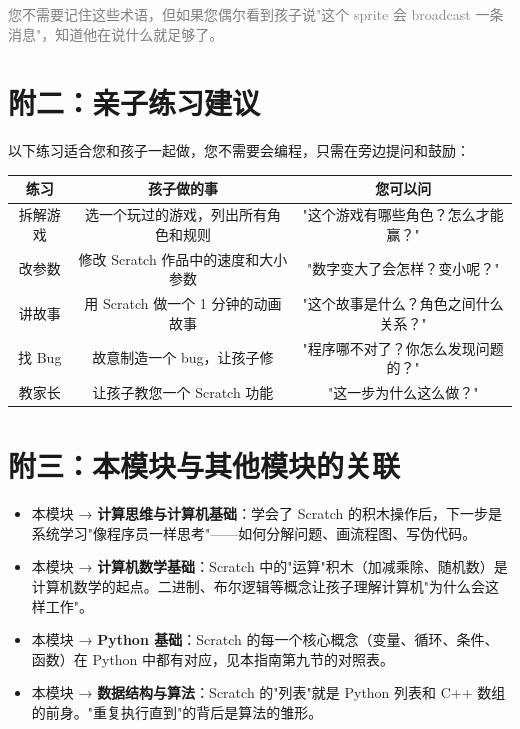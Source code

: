 \documentclass[a4paper,12pt]{ctexart}
\begin{document}
\vspace{0.5cm}
\textcolor{gray}{\small 您不需要记住这些术语，但如果您偶尔看到孩子说"这个 sprite 会 broadcast 一条消息"，知道他在说什么就足够了。}

\section*{附二：亲子练习建议}

以下练习适合您和孩子一起做，您不需要会编程，只需在旁边提问和鼓励：

\begin{center}
\begin{tabular}{|c|c|c|}
\hline
\textbf{练习} & \textbf{孩子做的事} & \textbf{您可以问} \\ \hline
拆解游戏 & 选一个玩过的游戏，列出所有角色和规则 & "这个游戏有哪些角色？怎么才能赢？" \\ \hline
改参数 & 修改 Scratch 作品中的速度和大小参数 & "数字变大了会怎样？变小呢？" \\ \hline
讲故事 & 用 Scratch 做一个 1 分钟的动画故事 & "这个故事是什么？角色之间什么关系？" \\ \hline
找 Bug & 故意制造一个 bug，让孩子修 & "程序哪不对了？你怎么发现问题的？" \\ \hline
教家长 & 让孩子教您一个 Scratch 功能 & "这一步为什么这么做？" \\ \hline
\end{tabular}
\end{center}

\section*{附三：本模块与其他模块的关联}

\begin{itemize}
  \item 本模块 → \textbf{计算思维与计算机基础}：学会了 Scratch 的积木操作后，下一步是系统学习"像程序员一样思考"——如何分解问题、画流程图、写伪代码。
  \item 本模块 → \textbf{计算机数学基础}：Scratch 中的"运算"积木（加减乘除、随机数）是计算机数学的起点。二进制、布尔逻辑等概念让孩子理解计算机"为什么会这样工作"。
  \item 本模块 → \textbf{Python 基础}：Scratch 的每一个核心概念（变量、循环、条件、函数）在 Python 中都有对应，见本指南第九节的对照表。
  \item 本模块 → \textbf{数据结构与算法}：Scratch 的"列表"就是 Python 列表和 C++ 数组的前身。"重复执行直到"的背后是算法的雏形。
\end{itemize}
\end{document}
